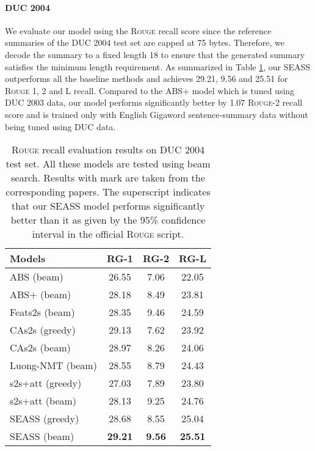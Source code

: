 \documentclass[11pt,a4paper]{article}
\newcommand{\ourModelName}{SEASS}
\begin{document}
\paragraph{DUC 2004}
We evaluate our model using the \textsc{Rouge} recall score since the reference summaries of the DUC 2004 test set are capped at 75 bytes.
Therefore, we decode the summary to a fixed length 18 to ensure that the generated summary satisfies the minimum length requirement.
As summarized in Table \ref{duc-table}, our \ourModelName{} outperforms all the baseline methods and achieves 29.21, 9.56 and 25.51 for \textsc{Rouge} 1, 2 and L recall.
Compared to the ABS+ model which is tuned using DUC 2003 data, our model performs significantly better by 1.07 \textsc{Rouge}-2 recall score and is trained only with English Gigaword sentence-summary data without being tuned using DUC data.

\begin{table}[htb]
	\begin{center}
		\setlength\tabcolsep{5pt}
		\begin{tabular}{lccc}
			\toprule
			\bf Models & \bf RG-1 & \bf RG-2 & \bf RG-L \\ 
			\midrule
			ABS (beam)\otherpaper{} & 26.55\significant{}  & 7.06\significant{}  & 22.05\significant{} \\
			ABS+ (beam)\otherpaper & 28.18\significant{}  & 8.49\significant{}  & 23.81\significant{} \\
			Feats2s (beam)\otherpaper & 28.35\significant{} & 9.46  & 24.59\significant{} \\
			CAs2s (greedy)\otherpaper & 29.13  & 7.62\significant{}  & 23.92\significant{} \\
			CAs2s (beam)\otherpaper & 28.97  & 8.26\significant{}  & 24.06\significant{} \\
			Luong-NMT (beam)\otherpaper{} & 28.55 & 8.79\significant{}  & 24.43\significant{} \\
			s2s+att (greedy) & 27.03\significant{} & 7.89\significant{} &  23.80\significant{} \\
			s2s+att (beam) & 28.13 & 9.25 &  24.76 \\
			\hline
			\ourModelName{} (greedy) & 28.68 & 8.55  & 25.04 \\
			\ourModelName{} (beam) & \textbf{29.21} & \textbf{9.56}  & \textbf{25.51} \\
			\bottomrule
		\end{tabular}
	\end{center}
	\caption{\label{duc-table} \textsc{Rouge} recall evaluation results on DUC 2004 test set. All these models are tested using beam search. Results with \otherpaper{} mark are taken from the corresponding papers. The superscript \significant{}  indicates that our \ourModelName{} model performs significantly better than it as given by the 95\% confidence interval in the official \textsc{Rouge} script.}
\end{table}
\end{document}
